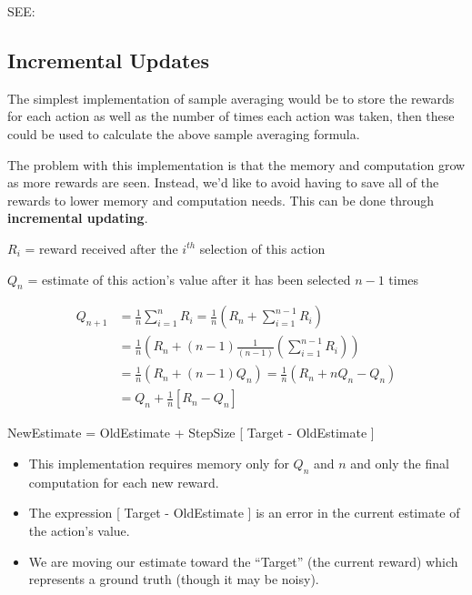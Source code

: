 SEE: 

\subsection{Incremental Updates}
The simplest implementation of sample averaging would be to store the rewards for each action as well as the number of times each action was taken, then these could be used to calculate the above sample averaging formula.

The problem with this implementation is that the memory and computation grow as more rewards are seen. Instead, we’d like to avoid having to save all of the rewards to lower memory and computation needs. This can be done through \textbf{incremental updating}.

\vspace{0.3cm}

$R_i$ = reward received after the $i^{th}$ selection of this action

$Q_n$ = estimate of this action’s value after it has been selected $n-1$ times

\begin{align}    
    Q_{n+1} &= \displaystyle\frac{1}{n} \sum_{i=1}^{n} R_i = \displaystyle\frac{1}{n} \left( R_n + \sum_{i=1}^{n-1} R_i \right) \\
    &= \displaystyle\frac{1}{n} \left( R_n + (n-1) \displaystyle\frac{1}{(n-1)}  \left(\displaystyle\sum_{i=1}^{n-1} R_i\right) \right)\\
    &= \displaystyle\frac{1}{n} (R_n + (n-1)Q_n) = \displaystyle\frac{1}{n} (R_n + nQ_n - Q_n)\\
    &= Q_n + \displaystyle\frac{1}{n} [R_n - Q_n]
\end{align}

NewEstimate = OldEstimate + StepSize [ Target - OldEstimate ]
\vspace{0.2cm}

\begin{itemize}
    \item This implementation requires memory only for $Q_n$ and $n$ and only the final computation for each new reward.
    \item The expression [ Target - OldEstimate ] is an error in the current estimate of the action’s value.
    \item We are moving our estimate toward the “Target” (the current reward) which represents a ground truth (though it may be noisy).
\end{itemize}

